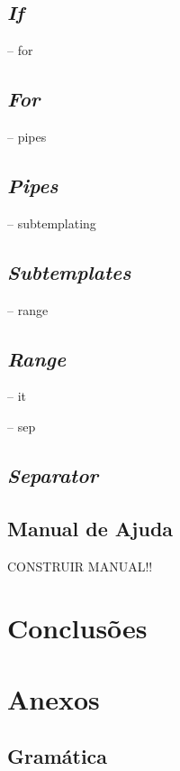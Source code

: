 \documentclass[runningheads]{llncs}
\begin{document}
\subsection{\textit{If}} \label{subsec:If}

-- for
\subsection{\textit{For}}\label{subsec:For}

-- pipes
\subsection{\textit{Pipes}} \label{subsec:pipes}

-- subtemplating
\subsection{\textit{Subtemplates}} \label{subsec:subt}

-- range
\subsection{\textit{Range}} \label{subsec:range}

-- it 

-- sep 
\subsection{\textit{Separator}} \label{subsec:sep}


\subsection{Manual de Ajuda}
CONSTRUIR MANUAL!!

\section{Conclusões}



\section{Anexos}\label{sec:anexos}

\subsection{Gramática} \label{fig:grammar}
\inputminted{bash}{assets/gramatica.txt}

%
%
%
% 
% 


\end{document}
